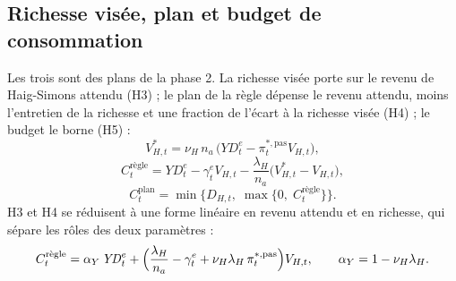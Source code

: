 \documentclass[11pt,a4paper]{article}
\begin{document}
\subsection{Richesse visée, plan et budget de consommation}
\label{sec:menages-plan}
\begin{proposee}
Les trois sont des plans de la phase 2. La richesse visée porte sur le revenu de Haig-Simons attendu (H3) ; le plan de la règle dépense le revenu attendu, moins l'entretien de la richesse et une fraction de l'écart à la richesse visée (H4) ; le budget le borne (H5) :
\begin{equation*}
V^\ast_{H,t} = \nu_H\, n_a\, \bigl(\mathit{YD}^e_t - \pi^{\ast,\mathrm{pas}}_t V_{H,t}\bigr), \tag{H3}
\end{equation*}
\begin{equation*}
C^{\text{règle}}_t = \mathit{YD}^e_t - \gamma^e_t V_{H,t} - \frac{\lambda_H}{n_a}\bigl(V^\ast_{H,t} - V_{H,t}\bigr), \tag{H4}
\end{equation*}
\begin{equation*}
C^{\mathrm{plan}}_t = \min\bigl\{D_{H,t},\; \max\{0,\; C^{\text{règle}}_t\}\bigr\} . \tag{H5}
\end{equation*}
H3 et H4 se réduisent à une forme linéaire en revenu attendu et en richesse, qui sépare les rôles des deux paramètres :
\begin{equation*}
C^{\text{règle}}_t = \alpha_Y\, \mathit{YD}^e_t + \Bigl(\frac{\lambda_H}{n_a} - \gamma^e_t + \nu_H \lambda_H\, \pi^{\ast,\mathrm{pas}}_t\Bigr) V_{H,t}, \qquad \alpha_Y = 1 - \nu_H \lambda_H .
\end{equation*}


\end{proposee}
\end{document}
